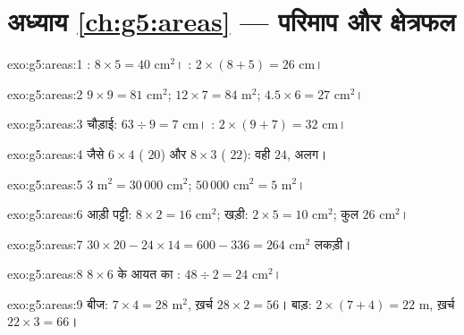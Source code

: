 \section*{अध्याय \ref{ch:g5:areas} --- परिमाप और क्षेत्रफल}

\begin{solution}{exo:g5:areas:1}
: $8 \times 5 = 40$ cm$^2$। :
$2 \times (8 + 5) = 26$ cm।
\end{solution}

\begin{solution}{exo:g5:areas:2}
$9 \times 9 = 81$ cm$^2$; \quad $12 \times 7 = 84$ m$^2$; \quad
$4.5 \times 6 = 27$ cm$^2$।
\end{solution}

\begin{solution}{exo:g5:areas:3}
चौड़ाई: $63 \div 9 = 7$ cm। : $2 \times (9 + 7) = 32$ cm।
\end{solution}

\begin{solution}{exo:g5:areas:4}
जैसे $6 \times 4$ ( $20$) और $8 \times 3$
( $22$):  वही $24$,  अलग।
\end{solution}

\begin{solution}{exo:g5:areas:5}
$3$ m$^2 = 30\,000$ cm$^2$; \quad $50\,000$ cm$^2 = 5$ m$^2$।
\end{solution}

\begin{solution}{exo:g5:areas:6}
आड़ी पट्टी: $8 \times 2 = 16$ cm$^2$; खड़ी: $2 \times 5 = 10$ cm$^2$;
कुल $26$ cm$^2$।
\end{solution}

\begin{solution}{exo:g5:areas:7}
$30 \times 20 - 24 \times 14 = 600 - 336 = 264$ cm$^2$ लकड़ी।
\end{solution}

\begin{solution}{exo:g5:areas:8}
$8 \times 6$ के आयत का : $48 \div 2 = 24$ cm$^2$।
\end{solution}

\begin{solution}{exo:g5:areas:9}
बीज:  $7 \times 4 = 28$ m$^2$, ख़र्च $28 \times 2 = 56$।
बाड़:  $2 \times (7 + 4) = 22$ m, ख़र्च
$22 \times 3 = 66$।
\end{solution}

